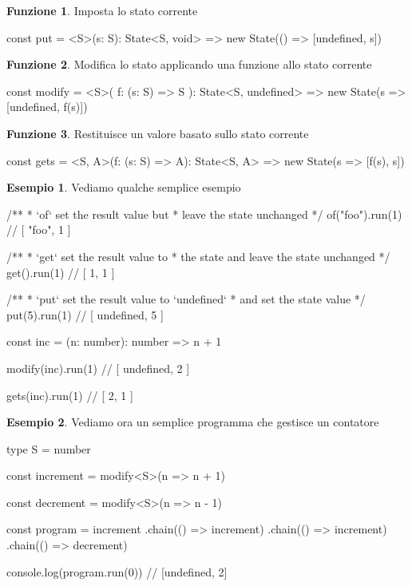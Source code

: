 \documentclass[12pt]{article}
\theoremstyle{definition}
\newtheorem{example}{Esempio}[section]
\newtheorem{function}{Funzione}[section]
\newenvironment{code}
  {\vspace{0.5cm} \VerbatimEnvironment\begin{typescriptcode}}
  {\end{typescriptcode} \vspace{0.2cm}}
\begin{document}
\begin{function}
Imposta lo stato corrente

\begin{code}
const put = <S>(s: S): State<S, void> =>
  new State(() => [undefined, s])
\end{code}
\end{function}

\begin{function}
Modifica lo stato applicando una funzione allo stato corrente

\begin{code}
const modify = <S>(
  f: (s: S) => S
): State<S, undefined> => new State(s => [undefined, f(s)])
\end{code}
\end{function}

\begin{function}
Restituisce un valore basato sullo stato corrente

\begin{code}
const gets = <S, A>(f: (s: S) => A): State<S, A> =>
  new State(s => [f(s), s])
\end{code}
\end{function}

\begin{example}
Vediamo qualche semplice esempio

\begin{code}
/**
 * `of` set the result value but
 * leave the state unchanged
 */
of("foo").run(1) // [ "foo", 1 ]

/**
 * `get` set the result value to
 * the state and leave the state unchanged
 */
get().run(1) // [ 1, 1 ]

/**
 * `put` set the result value to `undefined`
 * and set the state value
 */
put(5).run(1) // [ undefined, 5 ]

const inc = (n: number): number => n + 1

modify(inc).run(1) // [ undefined, 2 ]

gets(inc).run(1) // [ 2, 1 ]
\end{code}
\end{example}

\begin{example}
Vediamo ora un semplice programma che gestisce un contatore

\begin{code}
type S = number

const increment = modify<S>(n => n + 1)

const decrement = modify<S>(n => n - 1)

const program = increment
  .chain(() => increment)
  .chain(() => increment)
  .chain(() => decrement)

console.log(program.run(0)) // [undefined, 2]
\end{code}
\end{example}
\end{document}
